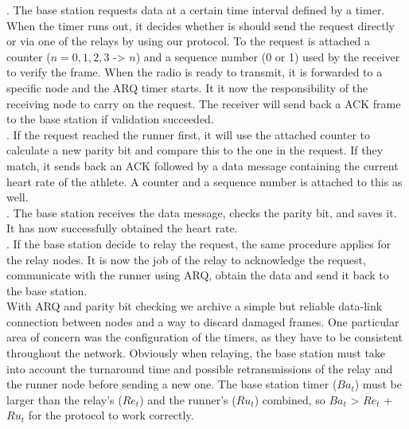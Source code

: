 . The base station requests data at a certain time interval defined by a timer. When the timer runs out, it decides whether is should send the request directly or via one of the relays by using our protocol. To the request is attached a counter ($n = 0, 1, 2, 3$ -> $n$) and a sequence number (0 or 1) used by the receiver to verify the frame. When the radio is ready to transmit, it is forwarded to a specific node and the ARQ timer starts. It it now the responsibility of the receiving node to carry on the request. The receiver will send back a ACK frame to the base station if validation succeeded.\\ . If the request reached the runner first, it will use the attached counter to calculate a new parity bit and compare this to the one in the request. If they match, it sends back an ACK followed by a data message containing the current heart rate of the athlete. A counter and a sequence number is attached to this as well.\\ . The base station receives the data message, checks the parity bit, and saves it. It has now successfully obtained the heart rate.\\ . If the base station decide to relay the request, the same procedure applies for the relay nodes. It is now the job of the relay to acknowledge the request, communicate with the runner using ARQ, obtain the data and send it back to the base station.\\ \newline
\noindent With ARQ and parity bit checking we archive a simple but reliable data-link connection between nodes and a way to discard damaged frames. One particular area of concern was the configuration of the timers, as they have to be consistent throughout the network. Obviously when relaying, the base station must take into account the turnaround time and possible retransmissions of the relay and the runner node before sending a new one. The base station timer ($Ba_t$) must be larger than the relay's ($Re_t$) and the runner's ($Ru_t$) combined, so $Ba_t$ > $Re_t$ + $Ru_t$ for the protocol to work correctly.